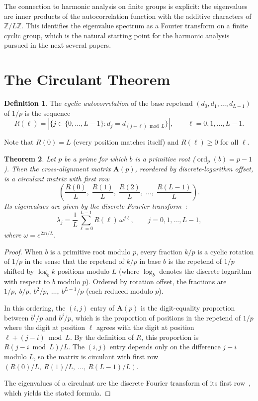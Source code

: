 \documentclass[12pt]{amsart}
\newtheorem{theorem}{Theorem}
\theoremstyle{definition}
\newtheorem{definition}[theorem]{Definition}
\theoremstyle{remark}
\begin{document}
The connection to harmonic analysis on finite groups is
explicit: the eigenvalues are inner products of the
autocorrelation function with the additive characters of
$\mathbb{Z}/L\mathbb{Z}$. This identifies the eigenvalue
spectrum as a Fourier transform on a finite cyclic group,
which is the natural starting point for the harmonic
analysis pursued in the next several papers.

\section{The Circulant Theorem}

\begin{definition}
The \emph{cyclic autocorrelation} of the base repetend
$(d_0, d_1, \ldots, d_{L-1})$ of $1/p$ is the sequence
\[
R(\ell) = |\{j \in \{0, \ldots, L{-}1\} : d_j = d_{(j+\ell)
\bmod L}\}|,
\qquad \ell = 0, 1, \ldots, L{-}1.
\]
\end{definition}

Note that $R(0) = L$ (every position matches itself) and
$R(\ell) \ge 0$ for all $\ell$.

\begin{theorem}\label{thm:circulant}
Let $p$ be a prime for which $b$ is a primitive root
($\operatorname{ord}_p(b) = p{-}1$). Then the cross-alignment
matrix $\mathbf{A}(p)$, reordered by discrete-logarithm
offset, is a circulant matrix with first row
\[
\left(\frac{R(0)}{L},\; \frac{R(1)}{L},\;
\frac{R(2)}{L},\; \ldots,\; \frac{R(L{-}1)}{L}\right).
\]
Its eigenvalues are given by the discrete Fourier
transform~\cite{davis}:
\[
\lambda_j = \frac{1}{L} \sum_{\ell=0}^{L-1}
R(\ell)\, \omega^{j\ell},
\qquad j = 0, 1, \ldots, L{-}1,
\]
where $\omega = e^{2\pi i / L}$.
\end{theorem}

\begin{proof}
When $b$ is a primitive root modulo $p$, every fraction $k/p$ is a
cyclic rotation of $1/p$ in the sense that the repetend of $k/p$ in
base $b$ is the repetend of $1/p$ shifted by $\log_b k$ positions
modulo $L$ (where $\log_b$ denotes the discrete logarithm with
respect to $b$ modulo $p$). Ordered by rotation offset, the
fractions are $1/p,\ b/p,\ b^2/p,\ \ldots,\ b^{L-1}/p$ (each
reduced modulo $p$).

In this ordering, the $(i, j)$ entry of $\mathbf{A}(p)$ is the
digit-equality proportion between $b^i/p$ and $b^j/p$, which is
the proportion of positions in the repetend of $1/p$ where the
digit at position $\ell$ agrees with the digit at position
$\ell + (j - i) \bmod L$. By the definition of $R$, this proportion
is $R(j - i \bmod L)/L$. The $(i,j)$ entry depends only on the
difference $j - i$ modulo $L$, so the matrix is circulant
with first row $(R(0)/L,\ R(1)/L,\ \ldots,\ R(L-1)/L)$.

The eigenvalues of a circulant are the discrete Fourier transform
of its first row~\cite{davis}, which yields the stated formula.
\end{proof}
\end{document}
